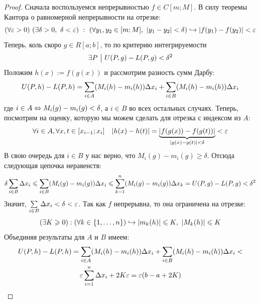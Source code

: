 \begin{proof}
	Сначала воспользуемся непрерывностью $f \in C[m; M]$. В силу теоремы Кантора о равномерной непрерывности на отрезке:
	\[
		(\forall \eps > 0)\ (\exists \delta > 0,\ \delta < \eps)\ :\  \left(\forall y_1, y_2 \in [m; M],\ |y_1 - y_2| < \delta\right)\emb |f(y_1) - f(y_2)| < \eps
	\]
	Теперь, коль скоро $g \in R[a; b]$, то по критерию интегрируемости
	\[
		\exists P \ \big|\  U(P, g) - L(P, g) < \delta^2
	\]
	Положим $h(x) := f(g(x))$ и рассмотрим разность сумм Дарбу:
	\[
		U(P, h) - L(P, h) = \sum\limits_{i \in A} (M_i(h) - m_i(h))\Delta x_i + \sum\limits_{i \in B} (M_i(h) - m_i(h)) \Delta x_i
	\]
	где $i \in A \Leftrightarrow M_i(g) - m_i(g) < \delta$, а $i \in B$ во всех остальных случаях. Теперь, посмотрим на оценку, которую мы можем сделать для отрезка с индексом из $A$:
	\[
		\forall i \in A, \forall x, t \in [x_{i - 1}; x_i] \quad |h(x) - h(t)| = \underbrace{|f(g(x)) - f(g(t))|}_{|g(x) - g(t)| < \delta} < \varepsilon
	\]
	В свою очередь для $i \in B$ у нас верно, что $M_i(g) - m_i(g) \ge \delta$. Отсюда следующая цепочка неравенств:
	\[
		\delta \sum\limits_{i \in B} \Delta x_i \leqslant \sum\limits_{i \in B} (M_i(g) - m_i(g)) \Delta x_i \leqslant \sum\limits_{k = 1}^n (M_i(g) - m_i(g)) \Delta x_k = U(P, g) - L(P, g) < \delta^2
	\]
	Значит, $\sum\limits_{i \in B} \Delta x_i < \delta < \varepsilon$. Так как $f$ непрерывна, то она ограничена на отрезке:
	\[
		(\exists K \geqslant 0) : (\forall k \in \{1, \ldots, n\}) \hookrightarrow |m_k(h)| \leqslant K,\ |M_k(h)| \leqslant K
	\]
	Объединяя результаты для $A$ и $B$ имеем:
	\begin{multline*}
		U(P, h) - L(P, h) = \sum\limits_{i \in A} (M_i(h) - m_i(h)) \Delta x_i + \sum\limits_{i \in B} (M_i(h) - m_i(h)) \Delta x_i <
		\\
		\varepsilon \sum\limits_{i = 1}^n \Delta x_i + 2K\varepsilon = \varepsilon (b - a + 2K)
	\end{multline*}
\end{proof}